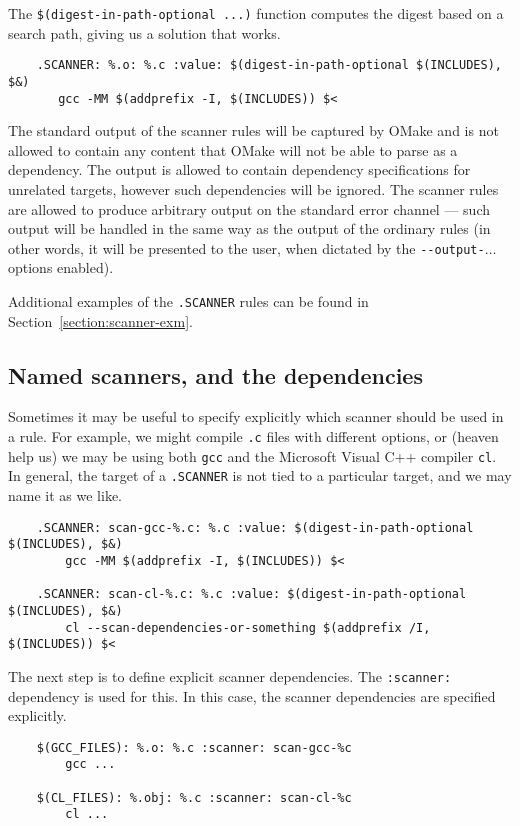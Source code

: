 The \verb+$(digest-in-path-optional ...)+ function computes the digest based on a search path,
giving us a solution that works.

\begin{verbatim}
    .SCANNER: %.o: %.c :value: $(digest-in-path-optional $(INCLUDES), $&)
       gcc -MM $(addprefix -I, $(INCLUDES)) $<
\end{verbatim}

The standard output of the scanner rules will be captured by OMake and is not allowed to contain any
content that OMake will not be able to parse as a dependency. The output is allowed to contain
dependency specifications for unrelated targets, however such dependencies will be ignored. The
scanner rules are allowed to produce arbitrary output on the standard error channel --- such output
will be handled in the same way as the output of the ordinary rules (in other words, it will be
presented to the user, when dictated by the \verb+--output-+$\ldots$ options enabled).

Additional examples of the \verb+.SCANNER+ rules can be found in Section~\ref{section:scanner-exm}.

\subsection{Named scanners, and the  dependencies}

Sometimes it may be useful to specify explicitly which scanner should be used in a rule.  For
example, we might compile \verb+.c+ files with different options, or (heaven help us) we may be
using both \verb+gcc+ and the Microsoft Visual C++ compiler \verb+cl+. In general, the target of a
\verb+.SCANNER+ is not tied to a particular target, and we may name it as we like.

\begin{verbatim}
    .SCANNER: scan-gcc-%.c: %.c :value: $(digest-in-path-optional $(INCLUDES), $&)
        gcc -MM $(addprefix -I, $(INCLUDES)) $<

    .SCANNER: scan-cl-%.c: %.c :value: $(digest-in-path-optional $(INCLUDES), $&)
        cl --scan-dependencies-or-something $(addprefix /I, $(INCLUDES)) $<
\end{verbatim}

The next step is to define explicit scanner dependencies.  The \verb+:scanner:+ dependency is used
for this.  In this case, the scanner dependencies are specified explicitly.

\begin{verbatim}
    $(GCC_FILES): %.o: %.c :scanner: scan-gcc-%c
        gcc ...

    $(CL_FILES): %.obj: %.c :scanner: scan-cl-%c
        cl ...
\end{verbatim}

